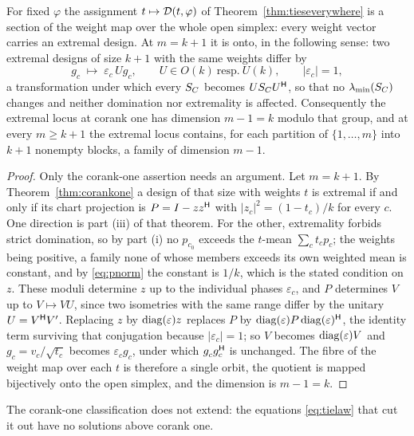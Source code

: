\begin{proposition}\label{prop:section}
For fixed $\varphi$ the assignment $t\mapsto \mathcal{D}(t,\varphi)$ of
Theorem~\ref{thm:tieseverywhere} is a section of the weight map over the
whole open simplex: every weight vector carries an extremal design.  At
$m=k+1$ it is onto, in the following sense: two extremal designs of size
$k+1$ with the same weights differ by
\[
  g_c\;\longmapsto\;\varepsilon_c\,Ug_c,
  \qquad U\in O(k)\ \text{resp.}\ U(k),\qquad
  \lvert\varepsilon_c\rvert=1 ,
\]
a transformation under which every $S_{C}$ becomes $US_{C} U^{\mathsf{H}}$, so that no
$\lambda_{\min}(S_{C})$ changes and neither domination nor extremality is
affected.  Consequently the extremal
locus at corank one has dimension $m-1=k$ modulo that group, and
at every $m\ge k+1$ the extremal locus contains, for each partition of
$\{1,\dots,m\}$ into $k+1$ nonempty blocks, a family of dimension $m-1$.
\end{proposition}

\begin{proof}
Only the corank-one assertion needs an argument.  Let $m=k+1$.  By
Theorem~\ref{thm:corankone} a design of that size with weights $t$ is
extremal if and only if its chart projection is $P=I-zz^{\mathsf{H}}$ with
$\lvert z_c\rvert^{2}=(1-t_c)/k$ for every $c$.  One direction is part
(iii) of that theorem.  For the other, extremality forbids strict
domination, so by part (i) no $p_{c_0}$ exceeds the $t$-mean
$\sum_ct_cp_c$; the weights being positive, a family none of whose members
exceeds its own weighted mean is constant, and by \eqref{eq:pnorm} the
constant is $1/k$, which is the stated condition on $z$.  These moduli
determine $z$ up to the individual phases $\varepsilon_c$, and $P$
determines $V$ up to $V\mapsto VU$, since two isometries with the same
range differ by the unitary $U=V^{\mathsf{H}} V'$.  Replacing $z$ by
$\operatorname{diag}(\varepsilon)z$ replaces $P$ by
$\operatorname{diag}(\varepsilon)P\operatorname{diag}(\varepsilon)^{\mathsf{H}}$, the identity term surviving
that conjugation because $\lvert\varepsilon_c\rvert=1$; so $V$ becomes
$\operatorname{diag}(\varepsilon)V$ and $g_c=v_c/\sqrt{t_c}$ becomes $\varepsilon_cg_c$,
under which $g_c^{\vphantom{\mathsf{H}}}g_c\adj$ is unchanged.  The fibre of
the weight map over each $t$ is therefore a single orbit, the
quotient is mapped bijectively onto the open simplex, and the dimension is
$m-1=k$.
\end{proof}

The corank-one classification does not extend: the equations
\eqref{eq:tielaw} that cut it out have no solutions above corank one.

